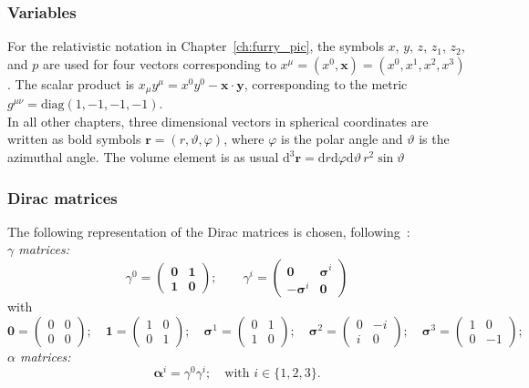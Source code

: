 \subsubsection{Variables}
For the relativistic notation in Chapter~\ref{ch:furry_pic}, the symbols $x$, $y$, $z$, $z_1$, $z_2$, and $p$ are used for four vectors corresponding to $x^\mu=(x^0,\mathbf{x})=(x^0,x^1,x^2,x^3)$. The scalar product is $x_\mu y^\mu = x^0 y^0 - \mathbf{x}\cdot\mathbf{y}$, corresponding to the metric $g^{\mu\nu}=\text{diag}(1,-1,-1,-1)$.\\
In all other chapters, three dimensional vectors in spherical coordinates are written as bold symbols $\mathbf{r}=(r,\vartheta,\varphi)$, where $\varphi$ is the polar angle and $\vartheta$ is the azimuthal angle. The volume element is as usual $\text{d}^3\mathbf{r}=\text{d}r\text{d}\varphi\text{d}\vartheta\, r^2 \sin\vartheta $
\subsubsection{Dirac matrices}
The following representation of the Dirac matrices is chosen, following~\cite{peskin1995}:\\
\textit{$\gamma$ matrices:}
\begin{equation}
\gamma^0 =
\begin{pmatrix}
\boldsymbol{0}&\boldsymbol{1}\\
\boldsymbol{1}&\boldsymbol{0}
\end{pmatrix};\qquad
\gamma^{i} = 
\begin{pmatrix}
\boldsymbol{0}&\boldsymbol{\sigma}^i\\
-\boldsymbol{\sigma}^i&\boldsymbol{0}
\end{pmatrix}
\end{equation}
with
\begin{equation}
\boldsymbol{0}=
\begin{pmatrix}
0&0\\0&0
\end{pmatrix};\quad
\boldsymbol{1}=
\begin{pmatrix}
1&0\\0&1
\end{pmatrix};\quad
\boldsymbol{\sigma}^1=
\begin{pmatrix}
0&1\\1&0
\end{pmatrix};\quad
\boldsymbol{\sigma}^2=
\begin{pmatrix}
0&-i\\i&0
\end{pmatrix};\quad
\boldsymbol{\sigma}^3=
\begin{pmatrix}
1&0\\0&-1
\end{pmatrix};\quad
\end{equation}
\textit{$\alpha$ matrices:}
\begin{equation}
\boldsymbol{\alpha}^i = \gamma^0 \gamma^i;\quad\text{with }i \in \{1,2,3\}.
\end{equation}

